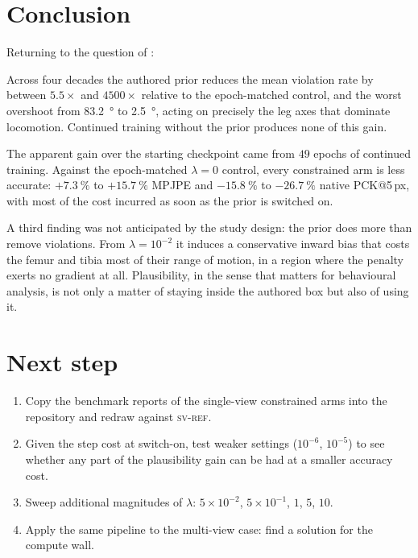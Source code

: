 \documentclass[11pt,a4paper]{article}
\newcommand{\lam}{\lambda}
\newcommand{\armref}{\textsc{sv-ref}}
\begin{document}
\section{Conclusion}
\label{sec:conclusion}

Returning to the question of :

\begin{description}[leftmargin=1.4em,style=nextline]
\item[More anatomically plausible poses --- yes.]
  Across four decades the authored prior reduces the mean violation rate by
  between $5.5\times$ and $4500\times$ relative to the epoch-matched control,
  and the worst overshoot from \SI{83.2}{\degree} to \SI{2.5}{\degree}, acting
  on precisely the leg axes that dominate locomotion. Continued training
  without the prior produces none of this gain.
\item[Without losing accuracy --- no.]
  The apparent gain over the starting checkpoint came from $49$ epochs of
  continued training. Against the epoch-matched $\lam = 0$ control, every
  constrained arm is less accurate: $+\SI{7.3}{\percent}$ to
  $+\SI{15.7}{\percent}$ MPJPE and $-\SI{15.8}{\percent}$ to
  $-\SI{26.7}{\percent}$ native PCK@5\,px, with most of the cost incurred as
  soon as the prior is switched on.
\end{description}

A third finding was not anticipated by the study design: the prior does more
than remove violations. From $\lam = 10^{-2}$ it induces a conservative
inward bias that costs the femur and tibia most of their range of motion, in a
region where the penalty exerts no gradient at all. Plausibility, in the sense
that matters for behavioural analysis, is not only a matter of staying inside
the authored box but also of using it.

\section{Next step}
\label{sec:next}

\begin{enumerate}[leftmargin=1.9em,itemsep=0.45em]

\item Copy the benchmark reports of the single-view constrained arms into
      the repository and redraw  against \armref{}.
\item Given the step cost at switch-on, test weaker settings
      ($10^{-6}$, $10^{-5}$) to see whether any part of the plausibility gain
      can be had at a smaller accuracy cost.
\item Sweep additional magnitudes of $\lam$: $5{\times}10^{-2}$,
      $5{\times}10^{-1}$, $1$, $5$, $10$.
\item Apply the same pipeline to the multi-view case: find a solution for the compute wall.
\end{enumerate}
\end{document}
